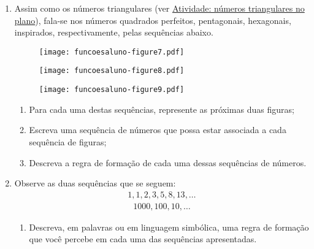 \documentclass[extrafontsizes, twoside, 11pt, openright, final]{memoir}
\begin{document}
\exercise


\begin{enumerate}
	\item  Assim como os números triangulares (ver {\hyperref[\detokenize{AF106-4:ativ-funcoes-numeros-triangulares}]{Atividade: números triangulares no plano}}), fala-se nos números quadrados perfeitos, pentagonais, hexagonais, inspirados, respectivamente, pelas sequências abaixo.
	      \label{\detokenize{AF106-E1:fig-figurados}}
	      \begin{figure}[H]
		      \begin{center}
			      \texttt{[image: funcoesaluno-figure7.pdf]}

			      \texttt{[image: funcoesaluno-figure8.pdf]}

			      \texttt{[image: funcoesaluno-figure9.pdf]}
		      \end{center}
	      \end{figure}

	      \begin{enumerate}
		      \item       Para cada uma destas sequências, represente as próximas duas figuras;

		      \item       Escreva uma sequência de números que possa estar associada a cada sequência de figuras;

		      \item       Descreva a regra de formação de cada uma dessas sequências de números.

	      \end{enumerate}

	      \clearpage
	\item Observe as duas sequências que se seguem:
	      \begin{equation*}
		      \begin{split}1, 1, 2, 3, 5, 8, 13, \dots\end{split}
	      \end{equation*}\begin{equation*}
		      \begin{split}1000, 100, 10, \dots\end{split}
	      \end{equation*}\begin{enumerate}
		      \item       Descreva, em palavras ou em linguagem simbólica, uma regra de formação que você percebe em cada uma das sequências apresentadas.


\end{enumerate}
\end{enumerate}
\end{document}

